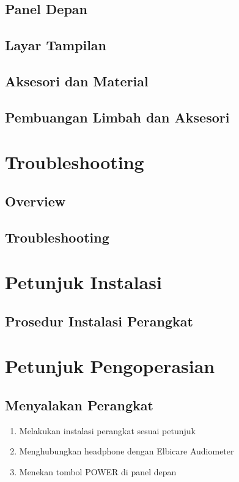 \documentclass[11pt,a4paper,twoside,draft,onecolumn]{book}
\begin{document}
		\section{Panel Depan}
		
		\section{Layar Tampilan}
		
		\section{Aksesori dan Material}
		
		\section{Pembuangan Limbah dan Aksesori}
		
	\newpage
	
	\chapter{Troubleshooting}
		\section{Overview}
		\section{Troubleshooting}
	\newpage
	
	\chapter{Petunjuk Instalasi}
		\section{Prosedur Instalasi Perangkat}
	\newpage
	
	\chapter{Petunjuk Pengoperasian}
		\section{Menyalakan Perangkat}
		\begin{enumerate}
			\item Melakukan instalasi perangkat sesuai petunjuk
			\item Menghubungkan headphone dengan Elbicare Audiometer
			\item Menekan tombol POWER di panel depan
		\end{enumerate}
	
\end{document}
